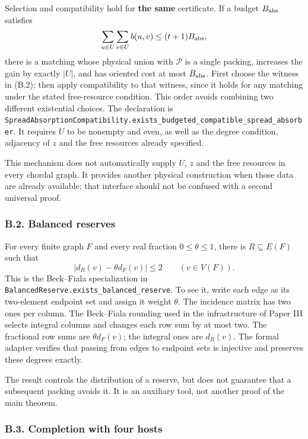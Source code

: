 \documentclass[english,11pt,a4paper]{article}
\newcounter{none}
\begin{document}
Selection and compatibility hold for \textbf{the same} certificate. If a budget \(B_{\rm abs}\) satisfies \[
\sum_{u\in U}\sum_{v\in U}b(u,v)\le(t+1)B_{\rm abs},
\] there is a matching whose physical union with \(\mathcal P\) is a single packing, increases the gain by exactly \(|U|\), and has oriented cost at most \(B_{\rm abs}\). First choose the witness in (B.2); then apply compatibility to that witness, since it holds for any matching under the stated free-resource condition. This order avoids combining two different existential choices. The declaration is \nolinkurl{SpreadAbsorptionCompatibility.exists_budgeted_compatible_spread_absorber}. It requires \(U\) to be nonempty and even, as well as the degree condition, adjacency of \(z\) and the free resources already specified.

This mechanism does not automatically supply \(U\), \(z\) and the free resources in every chordal graph. It provides another physical construction when those data are already available; that interface should not be confused with a second universal proof.

\subsubsection{B.2. Balanced reserves}\label{b.2.-balanced-reserves}

For every finite graph \(F\) and every real fraction \(0\le\theta\le1\), there is \(R\subseteq E(F)\) such that \[
|d_R(v)-\theta d_F(v)|\le2\qquad(v\in V(F)).
\tag{B.4}
\] This is the Beck--Fiala specialization in \nolinkurl{BalancedReserve.exists_balanced_reserve}. To see it, write each edge as its two-element endpoint set and assign it weight \(\theta\). The incidence matrix has two ones per column. The Beck--Fiala rounding used in the infrastructure of Paper III selects integral columns and changes each row sum by at most two. The fractional row sums are \(\theta d_F(v)\); the integral ones are \(d_R(v)\). The formal adapter verifies that passing from edges to endpoint sets is injective and preserves these degrees exactly.

The result controls the distribution of a reserve, but does not guarantee that a subsequent packing avoids it. It is an auxiliary tool, not another proof of the main theorem.

\subsubsection{B.3. Completion with four hosts}\label{b.3.-completion-with-four-hosts}
\end{document}
